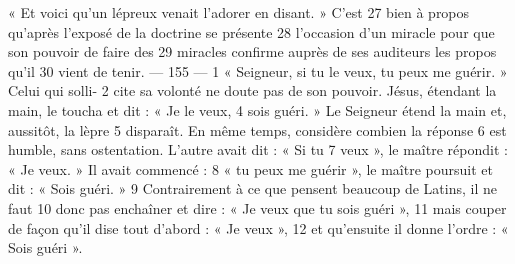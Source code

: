 « Et voici qu'un lépreux venait l'adorer en disant. » C'est	 
27	 	bien à propos qu'après l'exposé de la doctrine se présente	 
28	 	l'occasion d'un miracle pour que son pouvoir de faire des	 
29	 	miracles confirme auprès de ses auditeurs les propos qu'il	 
30	 	vient de tenir.	 
 	--- 155 ---	 
1	 	« Seigneur, si tu le veux, tu peux me guérir. » Celui qui solli-	 
2	 	cite sa volonté ne doute pas de son pouvoir.
Jésus, étendant la main, le toucha et dit : « Je le veux,	 
4	 	sois guéri. » Le Seigneur étend la main et, aussitôt, la lèpre	 
5	 	disparaît. En même temps, considère combien la réponse	 
6	 	est humble, sans ostentation. L'autre avait dit : « Si tu	 
7	 	veux », le maître répondit : « Je veux. » Il avait commencé :	 
8	 	« tu peux me guérir », le maître poursuit et dit : « Sois guéri. »	 
9	 	Contrairement à ce que pensent beaucoup de Latins, il ne faut	 
10	 	donc pas enchaîner et dire : « Je veux que tu sois guéri »,	 
11	 	mais couper de façon qu'il dise tout d'abord : « Je veux »,	 
12	 	et qu'ensuite il donne l'ordre : « Sois guéri ».
